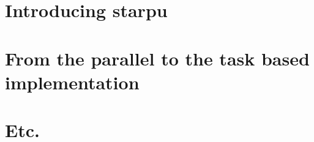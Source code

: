\documentclass[12pt,letterpaper,titlepage]{report}
\begin{document}
\section{Introducing starpu}


\section{From the parallel to the task based implementation}

\section{Etc.}
\end{document}
